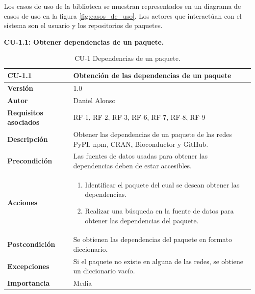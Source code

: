 Los casos de uso de la biblioteca se muestran representados en un diagrama de casos de uso en la figura \ref{fig:casos_de_uso}.
Los actores que interactúan con el sistema son el usuario y los repositorios de paquetes.

\textbf{CU-1.1: Obtener dependencias de un paquete.}

\begin{table}[p]
	\centering
	\begin{tabularx}{\linewidth}{ p{} p{} }
		\toprule
		\textbf{CU-1.1}               & \textbf{Obtención de las dependencias de un paquete}                              \\
		\toprule
		\textbf{Versión}              & 1.0                                                                              \\
		\textbf{Autor}                & Daniel Alonso                                                                    \\
		\textbf{Requisitos asociados} & RF-1, RF-2, RF-3, RF-6, RF-7, RF-8, RF-9                                         \\
		\textbf{Descripción}          & Obtener las dependencias de un paquete de las redes
		PyPI, npm, CRAN, Bioconductor y GitHub.                                                                          \\
		\textbf{Precondición}         & Las fuentes de datos usadas para obtener las dependencias
		deben de estar accesibles.                                                                                       \\
		\textbf{Acciones}             &
		\begin{enumerate}
			\def\labelenumi{\arabic{enumi}.}
			\tightlist
			\item Identificar el paquete del cual se desean obtener las dependencias.
			\item Realizar una búsqueda en la fuente de datos para obtener las dependencias del paquete.
		\end{enumerate}                      \\
		\textbf{Postcondición}        & Se obtienen las dependencias del paquete en formato diccionario.                 \\
		\textbf{Excepciones}          & Si el paquete no existe en alguna de las redes, se obtiene un diccionario vacío. \\
		\textbf{Importancia}          & Media                                                                            \\
		\bottomrule
	\end{tabularx}
	\caption{CU-1 Dependencias de un paquete.}
	\label{tab:cu1}
\end{table}

